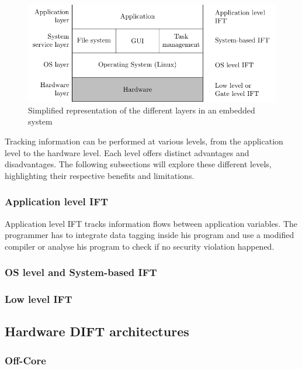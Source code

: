 \begin{figure}[ht]
    \centering
    \includegraphics{c2_soa/img/system_layer.pdf}
    \caption{Simplified representation of the different layers in an embedded system}
    \label{fig:levels_system}
\end{figure}

Tracking information can be performed at various levels, from the application level to the hardware level. Each level offers distinct advantages and disadvantages.
The following subsections will explore these different levels, highlighting their respective benefits and limitations.

\subsubsection{Application level IFT}
Application level IFT tracks information flows between application variables. The programmer has to integrate data tagging inside his program and use a modified compiler or analyse his program to check if no security violation happened.


\subsubsection{OS level and System-based IFT}
\subsubsection{Low level IFT}

\subsection{Hardware DIFT architectures}
\subsubsection{Off-Core}

